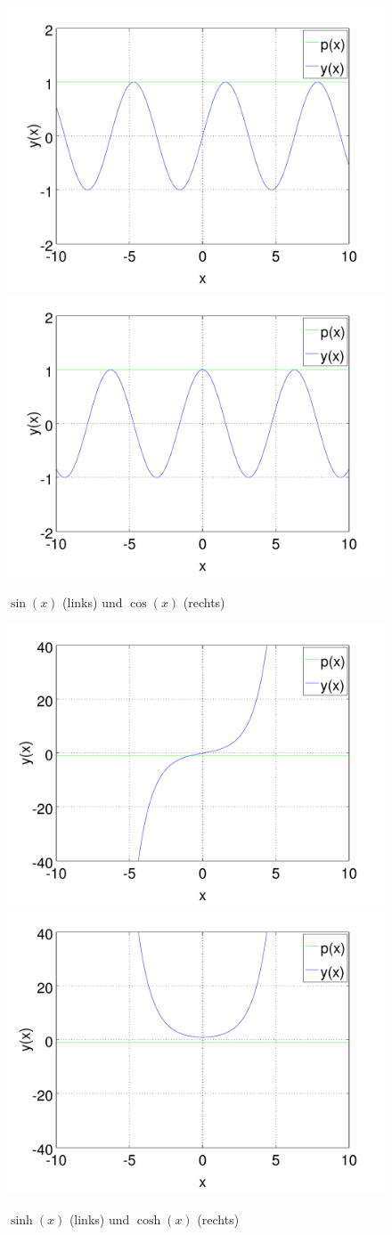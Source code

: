 \begin{figure}
	\includegraphics[width=0.51\hsize]{./wellen/images/basicfunctions/sin.pdf}
	\includegraphics[width=0.51\hsize]{./wellen/images/basicfunctions/cos.pdf}
	\caption{$\sin(x)$ (links) und $\cos(x)$ (rechts)}
	\label{fig:wellen:sin-cos}
\end{figure}

\begin{figure}
	\includegraphics[width=0.51\hsize]{./wellen/images/basicfunctions/sinh.pdf}
	\includegraphics[width=0.51\hsize]{./wellen/images/basicfunctions/cosh.pdf}
	\caption{$\sinh(x)$ (links) und $\cosh(x)$ (rechts)}
	\label{fig:wellen:sinh-cosh}
\end{figure}
